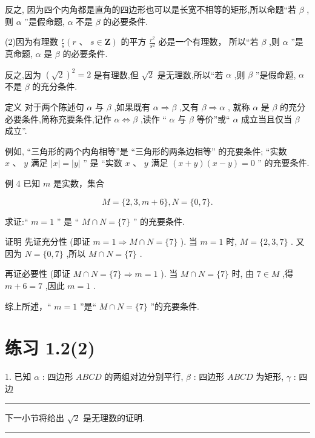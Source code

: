 \documentclass[10pt]{article}
\newcommand{\HRule}{\begin{center}\rule{0.9\linewidth}{0.2mm}\end{center}}
\begin{document}
反之, 因为四个内角都是直角的四边形也可以是长宽不相等的矩形,所以命题“若 \(\beta\) ,则 \(\alpha\) ”是假命题, \(\alpha\) 不是 \(\beta\) 的必要条件.

(2)因为有理数 \(\frac{r}{s}\left( {r\text{ 、 }s \in  \mathbf{Z}}\right)\) 的平方 \(\frac{{r}^{2}}{{s}^{2}}\) 必是一个有理数， 所以“若 \(\beta\) ,则 \(\alpha\) ”是真命题, \(\alpha\) 是 \(\beta\) 的必要条件.

反之,因为 \({\left( \sqrt{2}\right) }^{2} = 2\) 是有理数,但 \(\sqrt{2}\) 是无理数,所以“若 \(\alpha\) ,则 \(\beta\) ”是假命题, \(\alpha\) 不是 \(\beta\) 的充分条件.

定义 对于两个陈述句 \(\alpha\) 与 \(\beta\) ,如果既有 \(\alpha  \Rightarrow  \beta\) ,又有 \(\beta  \Rightarrow  \alpha\) , 就称 \(\alpha\) 是 \(\beta\) 的充分必要条件,简称充要条件,记作 \(\alpha  \Leftrightarrow  \beta\) ,读作 “ \(\alpha\) 与 \(\beta\) 等价”或“ \(\alpha\) 成立当且仅当 \(\beta\) 成立”.

例如, “三角形的两个内角相等”是 “三角形的两条边相等” 的充要条件; “实数 \(x\text{ 、 }y\) 满足 \(\left| x\right|  = \left| y\right|\) ” 是 “实数 \(x\text{ 、 }y\) 满足 \(\left( {x + y}\right) \left( {x - y}\right)  = 0\) ” 的充要条件.

例 4 已知 \(m\) 是实数，集合

\[
M = \{ 2,3,m + 6\} ,N = \{ 0,7\} .
\]

求证:“ \(m = 1\) ” 是 “ \(M \cap  N = \{ 7\}\) ” 的充要条件.

证明 先证充分性 (即证 \(m = 1 \Rightarrow  M \cap  N = \{ 7\}\) ). 当 \(m = 1\) 时, \(M = \{ 2,3,7\}\) . 又因为 \(N = \{ 0,7\}\) ,所以 \(M \cap  N = \{ 7\}\) .

再证必要性 (即证 \(M \cap  N = \{ 7\}  \Rightarrow  m = 1\) ). 当 \(M \cap  N = \{ 7\}\) 时, 由 \(7 \in  M\) ,得 \(m + 6 = 7\) ,因此 \(m = 1\) .

综上所述，“ \(m = 1\) ”是“ \(M \cap  N = \{ 7\}\) ”的充要条件.

\section*{练习 1.2(2)}

1. 已知 \(\alpha\) : 四边形 \({ABCD}\) 的两组对边分别平行, \(\beta\) : 四边形 \({ABCD}\) 为矩形, \(\gamma\) : 四边

\HRule

下一小节将给出 \(\sqrt{2}\) 是无理数的证明.

\HRule

\section*{}
\end{document}
